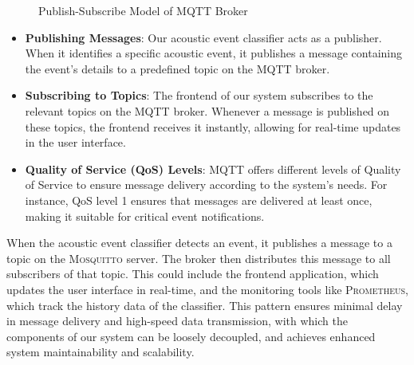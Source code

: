 \begin{figure}[htbp]
  \centering
  \caption{\label{fig:mqtt} Publish-Subscribe Model of MQTT Broker}
\end{figure}

\begin{itemize}
  \item \textbf{Publishing Messages}: Our acoustic event classifier acts as a publisher. When it identifies a specific acoustic event, it publishes a message containing the event's details to a predefined topic on the MQTT broker.
  \item \textbf{Subscribing to Topics}: The frontend of our system subscribes to the relevant topics on the MQTT broker. Whenever a message is published on these topics, the frontend receives it instantly, allowing for real-time updates in the user interface.
  \item \textbf{Quality of Service (QoS) Levels}: MQTT offers different levels of Quality of Service to ensure message delivery according to the system's needs. For instance, QoS level 1 ensures that messages are delivered at least once, making it suitable for critical event notifications.
\end{itemize}

When the acoustic event classifier detects an event, it publishes a message to a topic on the \textsc{Mosquitto} server. The broker then distributes this message to all subscribers of that topic. This could include the frontend application, which updates the user interface in real-time, and the monitoring tools like \textsc{Prometheus}, which track the history data of the classifier. This pattern ensures minimal delay in message delivery and high-speed data transmission, with which the components of our system can be loosely decoupled, and achieves enhanced system maintainability and scalability.

